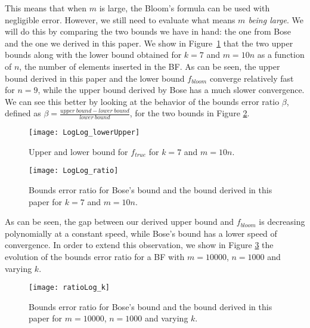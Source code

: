 This means that when $m$ is large, the Bloom's formula can be used with negligible error. 
%
However, we still need to evaluate what means \textit{$m$ being large}. 
%
We will do this by comparing the two bounds we have in hand: the one from Bose and the one we derived in this paper.
%
We show in Figure~\ref{fig:uplowbound} that the two upper bounds along with the lower bound obtained for $k=7$  and $m=10n$ as a function of $n$, the number of elements inserted in the BF.
%
As can be seen, the upper bound derived in this paper and the lower bound $f_{bloom}$ converge relatively fast for $n=9$, while the upper bound derived by Bose has a much slower convergence. 
%
We can see this better by looking at the behavior of the bounds error ratio $\beta$, defined as $\beta=\frac{upper\ bound - lower\ bound}{lower\ bound}$, for the two bounds in Figure \ref{fig:ratio}.

\begin{figure}[t]
\centering
\prefig
\vspace{-0.1in}
\texttt{[image: LogLog\_lowerUpper]}
\postfig\precaption
\vspace{0.1in}
\caption{Upper and lower bound for $f_{true}$ for $k=7$ and $m=10n$.} 
\postcaption
\vspace{0.1in}
\label{fig:uplowbound}
\end{figure}

\begin{figure}[t]
\centering
\prefig
\texttt{[image: LogLog\_ratio]}
\postfig\precaption\vspace{0.1in}
\caption{Bounds error ratio for Bose's bound and the bound derived in this paper for $k=7$ and $m=10n$. } 
\postcaption
\vspace{0.1in}
\label{fig:ratio}
\end{figure}

As can be seen, the gap between our derived upper bound and $f_{bloom}$ is decreasing polynomially at a constant speed, while Bose's bound has a lower speed of convergence. In order to extend this observation, we show in Figure \ref{fig:ratiok} the evolution of the bounds error ratio for a BF with $m=10000$, $n=1000$ and varying $k$. 

\begin{figure}[htbp]
\centering
\prefig
\texttt{[image: ratioLog\_k]}
\postfig\precaption\vspace{0.10in}
\caption{Bounds error ratio for Bose's bound and the bound derived in this paper for $m=10000$, $n=1000$ and varying $k$.}  
\postcaption
\vspace{0.1in}
\label{fig:ratiok}
\end{figure}

